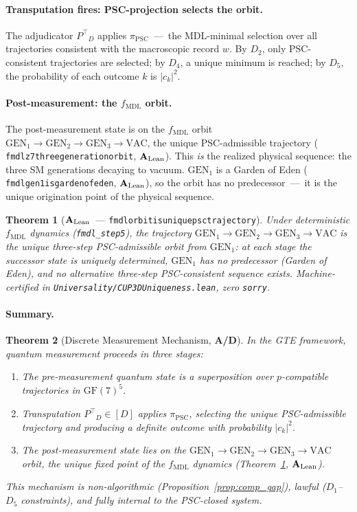 \documentclass[11pt]{article}
\newtheorem{theorem}{Theorem}[section]
\theoremstyle{remark}
\newcommand{\PSC}{\text{PSC}}
\newcommand{\GF}[1]{\ensuremath{\mathrm{GF}(#1)}}
\newcommand{\lean}[1]{%
  \penalty-100
  \begingroup\def\_{\textunderscore\allowbreak}\texttt{#1}\endgroup}
\newcommand{\fmdl}{\ensuremath{f_{\mathrm{MDL}}}}
\newcommand{\Ptop}{\ensuremath{P^{\top}}}
\newcommand{\CatAL}{\ensuremath{\textbf{A}_{\rm Lean}}}
\newcommand{\CatAD}{\textbf{A/D}}
\begin{document}
\paragraph{Transputation fires: PSC-projection selects the orbit.}
The adjudicator $\Ptop_D$ applies $\pi_{\PSC}$~---~the MDL-minimal
selection over all trajectories consistent with the macroscopic record
$w$. By $D_2$, only PSC-consistent trajectories are selected; by $D_4$,
a unique minimum is reached; by $D_5$, the probability of each outcome
$k$ is $|c_k|^2$.

\paragraph{Post-measurement: the \fmdl{} orbit.}
The post-measurement state is on the \fmdl{} orbit
$\mathrm{GEN}_1 \to \mathrm{GEN}_2 \to \mathrm{GEN}_3 \to \mathrm{VAC}$,
the unique PSC-admissible trajectory (\lean{fmdl\_z7\_three\_generation\_orbit},
\CatAL). This \emph{is} the realized physical sequence: the three SM
generations decaying to vacuum.
$\mathrm{GEN}_1$ is a Garden of Eden (\lean{fmdl\_gen1\_is\_garden\_of\_eden},
\CatAL), so the orbit has no predecessor~---~it is the unique origination
point of the physical sequence.

\begin{theorem}[\CatAL\ — \lean{fmdl\_orbit\_is\_unique\_psc\_trajectory}]
\label{thm:unique_orbit}
Under deterministic \fmdl{} dynamics (\texttt{fmdl\_step5}), the trajectory
$\mathrm{GEN}_1 \to \mathrm{GEN}_2 \to \mathrm{GEN}_3 \to \mathrm{VAC}$
is the unique three-step PSC-admissible orbit from $\mathrm{GEN}_1$: at each
stage the successor state is uniquely determined, $\mathrm{GEN}_1$ has no
predecessor (Garden of Eden), and no alternative three-step PSC-consistent
sequence exists.
Machine-certified in \lean{Universality/CUP3DUniqueness.lean}, zero
\texttt{sorry}.
\end{theorem}

\paragraph{Summary.}
\begin{theorem}[Discrete Measurement Mechanism, \CatAD]
\label{thm:measurement}
In the GTE framework, quantum measurement proceeds in three stages:
\begin{enumerate}[label=(\roman*)]
  \item The pre-measurement quantum state is a superposition over
    $p$-compatible trajectories in $\GF{7}^5$.
  \item Transputation $\Ptop_D \in [D]$ applies $\pi_{\PSC}$, selecting
    the unique PSC-admissible trajectory and producing a definite outcome
    with probability $|c_k|^2$.
  \item The post-measurement state lies on the
    $\mathrm{GEN}_1 \to \mathrm{GEN}_2 \to \mathrm{GEN}_3 \to \mathrm{VAC}$
    orbit, the unique fixed point of the \fmdl{} dynamics
    (Theorem~\ref{thm:unique_orbit}, \CatAL).
\end{enumerate}
This mechanism is non-algorithmic (Proposition~\ref{prop:comp_gap}),
lawful ($D_1$--$D_5$ constraints), and fully internal to the PSC-closed
system.
\end{theorem}
\end{document}
